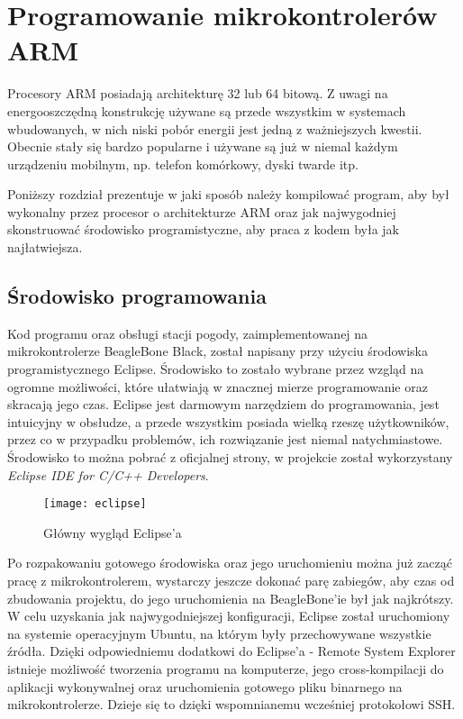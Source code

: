 \chapter{Programowanie mikrokontrolerów ARM}
Procesory ARM posiadają architekturę 32 lub 64 bitową. Z uwagi na energooszczędną konstrukcję używane są przede wszystkim w systemach wbudowanych, w nich niski pobór energii jest jedną z ważniejszych kwestii. Obecnie stały się bardzo popularne i używane są już w niemal każdym urządzeniu mobilnym, np. telefon komórkowy, dyski twarde itp.

Poniższy rozdział prezentuje w jaki sposób należy kompilować program, aby był wykonalny przez procesor o architekturze ARM oraz jak najwygodniej skonstruować środowisko programistyczne, aby praca z kodem była jak najłatwiejsza.

\section{Środowisko programowania}
Kod programu oraz obsługi stacji pogody, zaimplementowanej na mikrokontrolerze BeagleBone Black, został napisany przy użyciu środowiska programistycznego Eclipse. Środowisko to zostało wybrane przez wzgląd na ogromne możliwości, które ułatwiają w znacznej mierze programowanie oraz skracają jego czas. Eclipse jest darmowym narzędziem do programowania, jest intuicyjny w obsłudze, a przede wszystkim posiada wielką rzeszę użytkowników, przez co w przypadku problemów, ich rozwiązanie jest niemal natychmiastowe. Środowisko to można pobrać z oficjalnej strony, w projekcie został wykorzystany \emph{Eclipse IDE for C/C++ Developers}.

\begin{figure}[h]
\centering
\texttt{[image: eclipse]}
\caption{Główny wygląd Eclipse'a}
\label{fig:eclipse}
\end{figure}

Po rozpakowaniu gotowego środowiska oraz jego uruchomieniu można już zacząć pracę z mikrokontrolerem, wystarczy jeszcze dokonać parę zabiegów, aby czas od zbudowania projektu, do jego uruchomienia na BeagleBone'ie był jak najkrótszy. W celu uzyskania jak najwygodniejszej konfiguracji, Eclipse został uruchomiony na systemie operacyjnym Ubuntu, na którym były przechowywane wszystkie źródła. Dzięki odpowiedniemu dodatkowi do Eclipse'a - Remote System Explorer istnieje możliwość tworzenia programu na komputerze, jego cross-kompilacji do aplikacji wykonywalnej oraz uruchomienia gotowego pliku binarnego na mikrokontrolerze. Dzieje się to dzięki wspomnianemu wcześniej protokołowi SSH.

